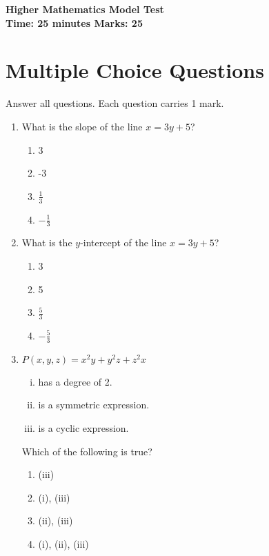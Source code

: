 \documentclass[12pt]{article}
\begin{document}
\begin{center}
    {\LARGE \textbf{Higher Mathematics Model Test}}\\[10pt]
    \textbf{Time: 25 minutes \hfill Marks: 25}
\end{center}

\vspace{5pt}
\section*{Multiple Choice Questions}
Answer all questions. Each question carries 1 mark.

\begin{enumerate}
    \item What is the slope of the line $x = 3y + 5$?
    \begin{enumerate}
        \item 3
        \item -3
        \item $\frac{1}{3}$
        \item $-\frac{1}{3}$
    \end{enumerate}

    \item What is the $y$-intercept of the line $x = 3y + 5$?
    \begin{enumerate}
        \item 3
        \item 5
        \item $\frac{5}{3}$
        \item $-\frac{5}{3}$
    \end{enumerate}

    \item $P(x, y, z) = x^2 y + y^2 z + z^2 x$
    \begin{enumerate}[(i)]
        \item has a degree of 2.
        \item is a symmetric expression.
        \item is a cyclic expression.
    \end{enumerate}
    Which of the following is true?
    \begin{enumerate}
        \item (iii)
        \item (i), (iii)
        \item (ii), (iii)
        \item (i), (ii), (iii)
    \end{enumerate}


\end{enumerate}
\end{document}
